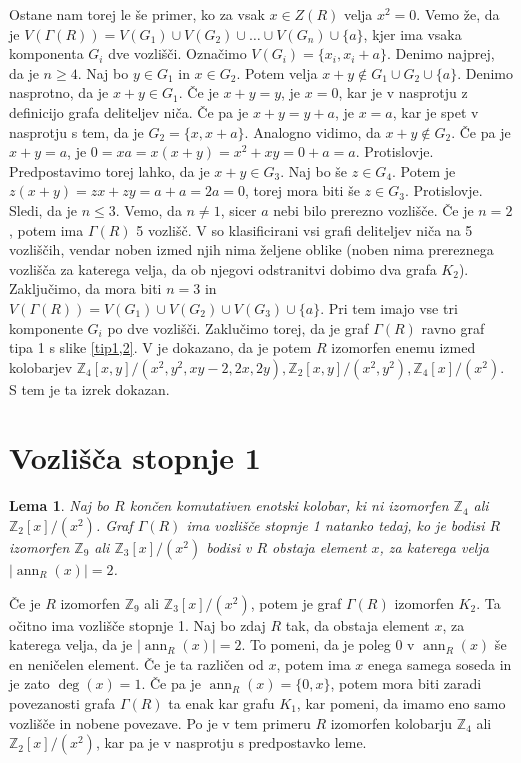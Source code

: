 \documentclass[a4paper, 12pt]{amsart}
\theoremstyle{definition} %
\theoremstyle{plain} %
\newtheorem{lema}[definicija]{Lema}
\newcommand{\Z}{\mathbb Z}
\DeclareMathOperator{\ann}{ann}
\begin{document}
Ostane nam torej le še primer, ko za vsak $x\in Z(R)$ velja $x^2 = 0$. Vemo že, da je $V(\Gamma(R)) = V(G_1) \cup V(G_2) \cup \dots \cup V(G_n) \cup \{a\}$, kjer ima vsaka komponenta $G_i$ dve vozlišči. Označimo $V(G_i) = \{x_i,x_i +a  \}$. Denimo najprej, da je $n\ge 4$. Naj bo $y\in G_1$ in $ x\in G_2$. Potem velja $x+y\notin G_1 \cup G_2 \cup \{a\}$. Denimo nasprotno, da je $x+y \in G_1$. Če je $x+y  = y$, je $x=0$, kar je v nasprotju z definicijo grafa deliteljev niča. Če pa je $x+y = y+a$, je $x=a$, kar je spet v nasprotju s tem, da je $G_2 = \{x,x+a\}$. Analogno vidimo, da $x+y\notin G_2$. Če pa je $x+y=a$, je $0 = xa = x(x+y) = x^2 + xy = 0+a = a$. Protislovje. Predpostavimo torej lahko, da je $x+y\in G_3$. Naj bo še $z\in G_4$. Potem je $z(x+y) = zx + zy = a +a = 2a = 0$, torej mora biti še $z\in G_3$. Protislovje. Sledi, da je $n\le 3$. Vemo, da $n\neq 1$, sicer $a$ nebi bilo prerezno vozlišče. Če je $n=2$, potem ima $\Gamma(R)$ 5 vozlišč. V \cite{Redmond} so klasificirani vsi grafi deliteljev niča na 5 vozliščih, vendar noben izmed njih nima željene oblike (noben nima prereznega vozlišča za katerega velja, da ob njegovi odstranitvi dobimo dva grafa $K_2$). Zaključimo, da mora biti $n=  3$ in $V( \Gamma(R)) = V(G_1) \cup V(G_2) \cup V(G_3) \cup \{a\}$. Pri tem imajo vse tri komponente $G_i$ po dve vozlišči. Zaklučimo torej, da je graf $\Gamma(R)$ ravno graf tipa 1 s slike \ref{tip1,2}. V \cite{Redmond} je dokazano, da je potem $R$ izomorfen enemu izmed kolobarjev $\Z_4[x,y]/(x^2,y^2,xy-2,2x,2y), \Z_2[x,y]/(x^2,y^2),\Z_4[x]/(x^2)$. S tem je ta izrek dokazan.


\endproof

\section{Vozlišča stopnje 1}

\begin{lema}
\label{vertexOfDegree1}
Naj bo $R$ končen komutativen enotski kolobar, ki ni izomorfen $\Z_4$ ali $\Z_2[x]/(x^2)$. Graf $\Gamma(R)$ ima vozlišče stopnje 1 natanko tedaj, ko je bodisi $R$ izomorfen $\Z_9$ ali $\Z_3[x]/(x^2)$ bodisi v $R$ obstaja element $x$, za katerega velja $|\ann_R(x) | = 2$.
\end{lema}

\proof
Če je $R$ izomorfen $\Z_9$ ali $\Z_3[x]/(x^2)$, potem je graf $\Gamma(R)$ izomorfen $K_2$. Ta očitno ima vozlišče stopnje 1. Naj bo zdaj $R$ tak, da obstaja element $x$, za katerega velja, da je $|\ann_R(x)| = 2$. To pomeni, da je poleg 0 v $\ann_R(x)$ še en neničelen element. Če je ta različen od $x$, potem ima $x$ enega samega soseda in je zato  $\deg(x) = 1$. Če pa je $\ann_R(x) = \{0,x\}$, potem mora biti zaradi povezanosti grafa $\Gamma(R)$ ta enak kar grafu $K_1$, kar pomeni, da imamo eno samo vozlišče in nobene povezave. Po \cite{Anderson-klasifikacijaMalihGrafov} je v tem primeru $R$ izomorfen kolobarju $\Z_4$ ali $\Z_2[x]/(x^2)$, kar pa je v nasprotju s predpostavko leme.
\end{document}
